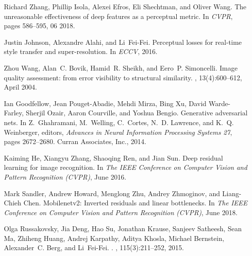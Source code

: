 \documentclass{article}
\begin{document}
{\begin{thebibliography}{10}
Richard Zhang, Phillip Isola, Alexei Efros, Eli Shechtman, and Oliver Wang.
\newblock The unreasonable effectiveness of deep features as a perceptual
  metric.
\newblock In {\em CVPR}, pages 586--595, 06 2018.

Justin Johnson, Alexandre Alahi, and Li~Fei-Fei.
\newblock Perceptual losses for real-time style transfer and super-resolution.
\newblock In {\em ECCV}, 2016.

Zhou Wang, Alan~C. Bovik, Hamid~R. Sheikh, and Eero~P. Simoncelli.
\newblock Image quality assessment: from error visibility to structural
  similarity.
, 13(4):600--612, April
  2004.

Ian Goodfellow, Jean Pouget-Abadie, Mehdi Mirza, Bing Xu, David Warde-Farley,
  Sherjil Ozair, Aaron Courville, and Yoshua Bengio.
\newblock Generative adversarial nets.
\newblock In Z.~Ghahramani, M.~Welling, C.~Cortes, N.~D. Lawrence, and K.~Q.
  Weinberger, editors, {\em Advances in Neural Information Processing Systems
  27}, pages 2672--2680. Curran Associates, Inc., 2014.

Kaiming He, Xiangyu Zhang, Shaoqing Ren, and Jian Sun.
\newblock Deep residual learning for image recognition.
\newblock In {\em The IEEE Conference on Computer Vision and Pattern
  Recognition (CVPR)}, June 2016.

Mark Sandler, Andrew Howard, Menglong Zhu, Andrey Zhmoginov, and Liang-Chieh
  Chen.
\newblock Mobilenetv2: Inverted residuals and linear bottlenecks.
\newblock In {\em The IEEE Conference on Computer Vision and Pattern
  Recognition (CVPR)}, June 2018.

Olga Russakovsky, Jia Deng, Hao Su, Jonathan Krause, Sanjeev Satheesh, Sean Ma,
  Zhiheng Huang, Andrej Karpathy, Aditya Khosla, Michael Bernstein,
  Alexander~C. Berg, and Li~Fei-Fei.
.
,
  115(3):211--252, 2015.

\end{thebibliography}
 
}

\newpage

\end{document}
